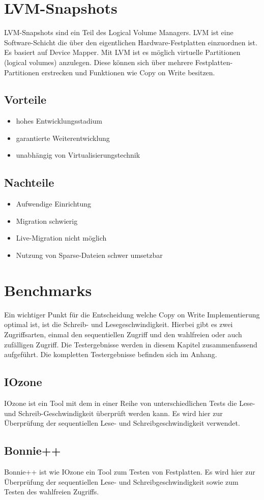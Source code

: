 \section{LVM-Snapshots}
LVM-Snapshots sind ein Teil des Logical Volume Managers. LVM ist eine Software-Schicht die über den eigentlichen Hardware-Festplatten einzuordnen ist. Es basiert auf Device Mapper. Mit LVM ist es möglich virtuelle Partitionen (logical volumes) anzulegen. Diese können sich über mehrere Festplatten-Partitionen erstrecken und Funktionen wie Copy on Write besitzen. \cite{lvmhowto} \cite{lvmselflinux} \cite{lvmsource}

\subsection{Vorteile}
\begin{itemize}
 \item hohes Entwicklungsstadium
 \item garantierte Weiterentwicklung
 \item unabhängig von Virtualisierungstechnik
\end{itemize}

\subsection{Nachteile}
\begin{itemize}
 \item Aufwendige Einrichtung
 \item Migration schwierig
 \item Live-Migration nicht möglich
 \item Nutzung von Sparse-Dateien schwer umsetzbar
\end{itemize}

\section{Benchmarks}
Ein wichtiger Punkt für die Entscheidung welche Copy on Write Implementierung optimal ist, ist die Schreib- und Lesegeschwindigkeit. Hierbei gibt es zwei Zugriffsarten, einmal den sequentiellen Zugriff und den wahlfreien oder auch zufälligen Zugriff. Die Testergebnisse werden in diesem Kapitel zusammenfassend aufgeführt. Die kompletten Testergebnisse befinden sich im Anhang.

\subsection{IOzone}
IOzone ist ein Tool mit dem in einer Reihe von unterschiedlichen Tests die Lese- und Schreib-Geschwindigkeit überprüft werden kann. Es wird hier zur Überprüfung der sequentiellen Lese- und Schreibgeschwindigkeit verwendet.
\subsection{Bonnie++}
Bonnie++ ist wie IOzone ein Tool zum Testen von Festplatten. Es wird hier zur Überprüfung der sequentiellen Lese- und Schreibgeschwindigkeit sowie zum Testen des wahlfreien Zugriffs.
